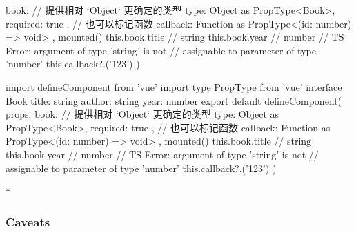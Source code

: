 \begin{paracol}{2}
\begin{codeTs}
{{    book: {
      // 提供相对 `Object` 更确定的类型
      type: Object as PropType<Book>,
      required: true
    },
    // 也可以标记函数
    callback: Function as PropType<(id: number) => void>
  },
  mounted() {
    this.book.title // string
    this.book.year // number
    // TS Error: argument of type 'string' is not
    // assignable to parameter of type 'number'
    this.callback?.('123')
  }
})
\end{codeTs}
\switchcolumn
\begin{codeTs}
import { defineComponent } from 'vue'
import type { PropType } from 'vue'
interface Book {
  title: string
  author: string
  year: number
}
export default defineComponent({
  props: {
    book: {
      // 提供相对 `Object` 更确定的类型
      type: Object as PropType<Book>,
      required: true
    },
    // 也可以标记函数
    callback: Function as PropType<(id: number) => void>
  },
  mounted() {
    this.book.title // string
    this.book.year // number
    // TS Error: argument of type 'string' is not
    // assignable to parameter of type 'number'
    this.callback?.('123')
  }
})
\end{codeTs}
\switchcolumn[0]*%
\subsubsection{Caveats}
\switchcolumn

\end{paracol}
